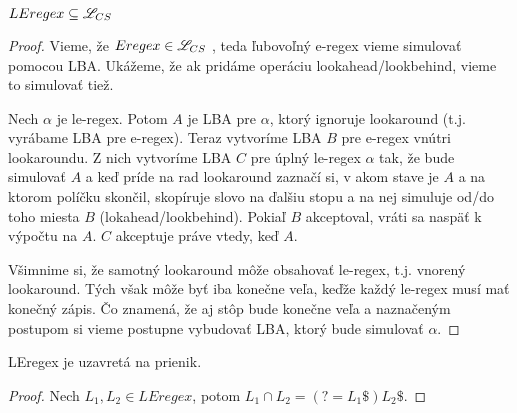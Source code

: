 \begin{veta}
$ LEregex \subseteq \mathscr{L}_{CS} $
\end{veta}
\begin{proof}
Vieme, že $ Eregex \in \mathscr{L}_{CS} $ \cite[Theorem 1]{ExtendedRegexPower}, teda ľubovoľný e-regex vieme simulovať pomocou LBA. Ukážeme, že ak pridáme operáciu lookahead/lookbehind, vieme to simulovať tiež.

Nech $\alpha$ je le-regex. Potom $A$ je LBA pre $\alpha$, ktorý ignoruje lookaround (t.j. vyrábame LBA pre e-regex). Teraz vytvoríme LBA $B$ pre e-regex vnútri lookaroundu. Z nich vytvoríme LBA $C$ pre úplný le-regex $\alpha$ tak, že bude simulovať $A$ a keď príde na rad lookaround zaznačí si, v akom stave je $A$ a na ktorom políčku skončil, skopíruje slovo na ďalšiu stopu a na nej simuluje od/do toho miesta $B$ (lokahead/lookbehind). Pokiaľ $B$ akceptoval, vráti sa naspäť k výpočtu na $A$. $C$ akceptuje práve vtedy, keď $A$.

Všimnime si, že samotný look\-a\-round môže obsahovať le-regex, t.j. vnorený lookaround. Tých však môže byť iba konečne veľa, keďže každý le-regex musí mať konečný zápis. Čo znamená, že aj stôp bude konečne veľa a naznačeným postupom si vieme postupne vybudovať LBA, ktorý bude simulovať $\alpha$.
\end{proof}

\begin{veta} \label{prienik}
LEregex je uzavretá na prienik.
\end{veta}
\begin{proof} 
Nech $L_1,L_2 \in LEregex$, potom $L_1 \cap L_2 = \left( ?= L_1 \mathdollar \right) L_2 \mathdollar $.
\end{proof}

